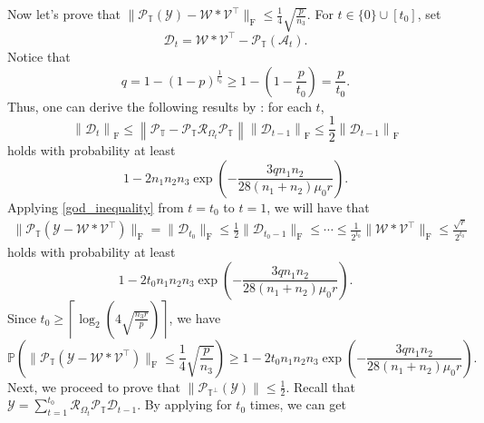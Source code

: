 \documentclass[twoside,12pt]{article}
\def\fro{{\mathrm{F}}}
\def\fro{{\mathrm{F}}}
\begin{document}
Now let's prove that $\|\mathcal{P}_{\mathbb{T}}(\mathcal{Y})-\mathcal{W}*\mathcal{V}^{\top}\|_{\fro}\leq \frac{1}{4}\sqrt{\frac{p}{n_3}}$. 
For $t \in \{0\}\cup[t_0]$,  set \begin{equation}\label{Dt}\mathcal{D}_{t} = \mathcal{W}*\mathcal{V}^{\top}-\mathcal{P}_{\mathbb{T}}(\mathcal{A}_t).\end{equation}
Notice that \begin{equation}\label{q}
    q = 1 - (1-p)^{\frac{1}{t_0}}\geq 1 - (1-\frac{p}{t_0})  = \frac{p}{t_0}.
\end{equation}
Thus, one can derive the following results  by : for each $t$,
\begin{equation}\label{god_inequality}
\left\|\mathcal{D}_t\right\|_{\fro} \leq\left\|\mathcal{P}_{\mathbb{T}}-\mathcal{P}_{\mathbb{T}} \mathcal{R}_{\Omega_t} \mathcal{P}_{\mathbb{T}}\right\|\left\|\mathcal{D}_{t-1}\right\|_{\fro} \leq \frac{1}{2}\left\|\mathcal{D}_{t-1}\right\|_{\fro}
\end{equation} holds with probability at least 
\begin{equation*}
    1-2n_1n_2n_3\exp(-\frac{3qn_1n_2}{28(n_1+n_2)\mu_0r}).
\end{equation*}
Applying   \eqref{god_inequality}  from $t=t_0$ to $t=1$, we will have that
\begin{align}
\|\mathcal{P}_{\mathbb{T}}(\mathcal{Y}-\mathcal{W}*\mathcal{V}^{\top})\|_{\fro}  = \|\mathcal{D}_{t_0}\|_{\fro} \leq \frac{1}{2}\|\mathcal{D}_{t_{0}-1}\|_{\fro} 
 \leq \cdots   
 \leq \frac{1}{2^{t_0}}\|\mathcal{W}*\mathcal{V}^{\top}\|_{\fro}  \leq \frac{\sqrt{r} }{2^{t_0}} \label{trick}
\end{align}
holds with probability  at least 
\begin{equation*}
    1-2t_0n_1n_2n_3\exp(-\frac{3qn_1n_2}{28(n_1+n_2)\mu_0r}).
\end{equation*} 
Since $t_0 \geq \left\lceil\log_{2}\left(4\sqrt{\frac{n_3r}{p}}\right)\right\rceil$, we have 
 \begin{equation}\label{eqn:probability4Fro}
 \mathbb{P}\left(\|\mathcal{P}_{\mathbb{T}}(\mathcal{Y}-\mathcal{W}*\mathcal{V}^{\top})\|_{\fro} \leq \frac{1}{4}\sqrt{\frac{p}{n_3}}\right)\geq    1-2t_0n_1n_2n_3\exp(-\frac{3qn_1n_2}{28(n_1+n_2)\mu_0r}).
\end{equation} 
Next, we proceed to prove that  $\|\mathcal{P}_{\mathbb{T}^{\perp}}(\mathcal{Y})\|\leq \frac{1}{2}$. Recall that $\mathcal{Y} = \sum\limits_{t=1}^{t_0}\mathcal{R}_{\Omega_t}\mathcal{P}_{\mathbb{T}}\mathcal{D}_{t-1}$. By applying  for $t_0$ times, we can get
\end{document}
